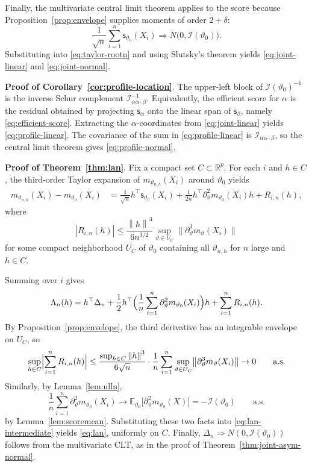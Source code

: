 \documentclass[11pt]{article}
\newcommand{\R}{\mathbb{R}}
\newcommand{\E}{\mathbb{E}}
\newcommand{\norm}[1]{\left\lVert #1\right\rVert}
\newcommand{\score}{\mathsf{s}}
\newcommand{\info}{\mathcal{I}}
\begin{document}
Finally, the multivariate central limit theorem applies to the score because Proposition~\ref{prop:envelope} supplies moments of order $2+\delta$:
\[
\frac1{\sqrt n}\sum_{i=1}^n \score_{\vartheta_0}(X_i)\Rightarrow N\bigl(0,\info(\vartheta_0)\bigr).
\]
Substituting into \eqref{eq:taylor-rootn} and using Slutsky's theorem yields \eqref{eq:joint-linear} and \eqref{eq:joint-normal}.


\medskip
\noindent \textbf{Proof of Corollary~\ref{cor:profile-location}}. The upper-left block of $\info(\vartheta_0)^{-1}$ is the inverse Schur complement $\info_{\alpha\alpha\cdot\beta}^{-1}$. Equivalently, the efficient score for $\alpha$ is the residual obtained by projecting $\score_\alpha$ onto the linear span of $\score_\beta$, namely \eqref{eq:efficient-score}. Extracting the $\alpha$-coordinates from \eqref{eq:joint-linear} yields \eqref{eq:profile-linear}. The covariance of the sum in \eqref{eq:profile-linear} is $\info_{\alpha\alpha\cdot\beta}$, so the central limit theorem gives \eqref{eq:profile-normal}.


\medskip 
\noindent \textbf{Proof of Theorem~\ref{thm:lan}}. Fix a compact set $C\subset\R^p$. For each $i$ and $h\in C$, the third-order Taylor expansion of $m_{\vartheta_{n,h}}(X_i)$ around $\vartheta_0$ yields
\begin{align*}
m_{\vartheta_{n,h}}(X_i)-m_{\vartheta_0}(X_i)
&=
\frac{1}{\sqrt n}h^\top \score_{\vartheta_0}(X_i)
+\frac{1}{2n} h^\top \partial_\vartheta^2 m_{\vartheta_0}(X_i) h
+R_{i,n}(h),
\end{align*}
where
\[
|R_{i,n}(h)|
\le
\frac{\norm{h}^3}{6n^{3/2}}
\sup_{\vartheta\in U_C}
\bigl\|\partial_\vartheta^3 m_\vartheta(X_i)\bigr\|
\]
for some compact neighborhood $U_C$ of $\vartheta_0$ containing all $\vartheta_{n,h}$ for $n$ large and $h\in C$.

Summing over $i$ gives
\begin{equation}
\label{eq:lan-intermediate}
\Lambda_n(h)
=
h^\top \Delta_n
+
\frac12 h^\top
\Bigl(\frac1n\sum_{i=1}^n \partial_\vartheta^2 m_{\vartheta_0}(X_i)\Bigr)h
+
\sum_{i=1}^n R_{i,n}(h).
\end{equation}
By Proposition~\ref{prop:envelope}, the third derivative has an integrable envelope on $U_C$, so
\[
\sup_{h\in C}\Bigl|\sum_{i=1}^n R_{i,n}(h)\Bigr|
\le
\frac{\sup_{h\in C}\norm{h}^3}{6\sqrt n}\cdot
\frac1n\sum_{i=1}^n
\sup_{\vartheta\in U_C}\bigl\|\partial_\vartheta^3 m_\vartheta(X_i)\bigr\|
\to 0
\qquad\text{a.s.}
\]
Similarly, by Lemma~\ref{lem:ulln},
\[
\frac1n\sum_{i=1}^n \partial_\vartheta^2 m_{\vartheta_0}(X_i)
\to
\E_{\vartheta_0}\bigl[\partial_\vartheta^2 m_{\vartheta_0}(X)\bigr]
=
-\info(\vartheta_0)
\qquad\text{a.s.}
\]
by Lemma~\ref{lem:scoremean}. Substituting these two facts into \eqref{eq:lan-intermediate} yields \eqref{eq:lan}, uniformly on $C$. Finally, $\Delta_n\Rightarrow N(0,\info(\vartheta_0))$ follows from the multivariate CLT, as in the proof of Theorem~\ref{thm:joint-asym-normal}.
\end{document}

